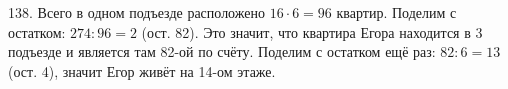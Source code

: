 138. Всего в одном подъезде расположено $16\cdot6=96$ квартир. Поделим с остатком: $274:96=2$ (ост. 82). Это значит, что квартира Егора находится в 3 подъезде и является там 82-ой по счёту. Поделим с остатком ещё раз: $82:6=13$ (ост. 4), значит Егор живёт на 14-ом этаже.\\

